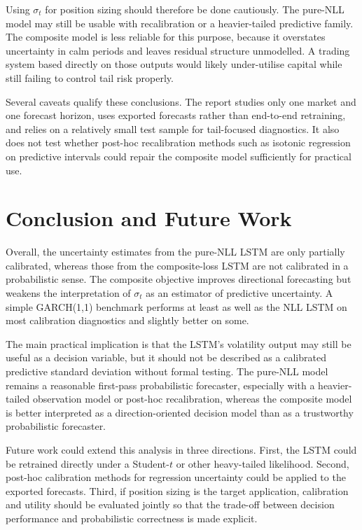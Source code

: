 \documentclass[%
 amsmath,amssymb,
 aps,
 pra,
 floatfix,
 raggedbottom,
 nofootinbib,
12pt,]{revtex4-2}
\begin{document}
Using $\sigma_t$ for position sizing should therefore be done cautiously. The pure-NLL model may still be usable with recalibration or a heavier-tailed predictive family. The composite model is less reliable for this purpose, because it overstates uncertainty in calm periods and leaves residual structure unmodelled. A trading system based directly on those outputs would likely under-utilise capital while still failing to control tail risk properly.

Several caveats qualify these conclusions. The report studies only one market and one forecast horizon, uses exported forecasts rather than end-to-end retraining, and relies on a relatively small test sample for tail-focused diagnostics. It also does not test whether post-hoc recalibration methods such as isotonic regression on predictive intervals \citep{kuleshov2018accurate} could repair the composite model sufficiently for practical use.

\section{Conclusion and Future Work}
\label{sec:conclusion}

Overall, the uncertainty estimates from the pure-NLL LSTM are only partially calibrated, whereas those from the composite-loss LSTM are not calibrated in a probabilistic sense. The composite objective improves directional forecasting but weakens the interpretation of $\sigma_t$ as an estimator of predictive uncertainty. A simple GARCH(1,1) benchmark performs at least as well as the NLL LSTM on most calibration diagnostics and slightly better on some.

The main practical implication is that the LSTM's volatility output may still be useful as a decision variable, but it should not be described as a calibrated predictive standard deviation without formal testing. The pure-NLL model remains a reasonable first-pass probabilistic forecaster, especially with a heavier-tailed observation model or post-hoc recalibration, whereas the composite model is better interpreted as a direction-oriented decision model than as a trustworthy probabilistic forecaster.

Future work could extend this analysis in three directions. First, the LSTM could be retrained directly under a Student-$t$ or other heavy-tailed likelihood. Second, post-hoc calibration methods for regression uncertainty \citep{kuleshov2018accurate} could be applied to the exported forecasts. Third, if position sizing is the target application, calibration and utility should be evaluated jointly so that the trade-off between decision performance and probabilistic correctness is made explicit.
\end{document}

